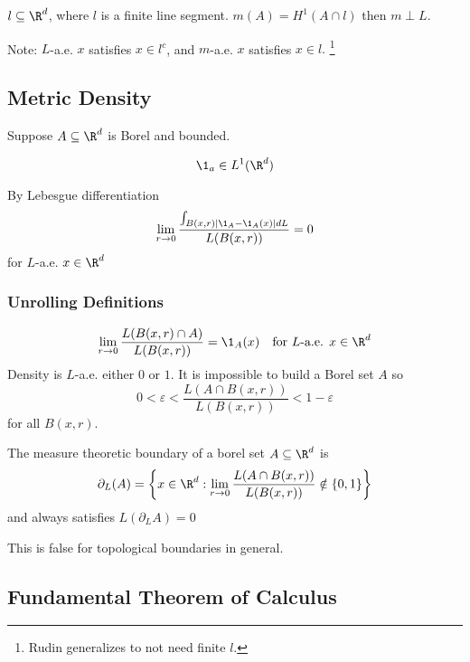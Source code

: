 \begin{example}
	$l \subseteq \R^d$, where $l$ is a finite line segment. $m(A) = H^1 (A \cap l)$
	then $m \perp L$.
\end{example}
Note: $L$-a.e. $x$ satisfies $x \in l^c$, and $m$-a.e. $x$ satisfies $x \in l.$
\footnote{Rudin generalizes to not need finite $l$.}

\subsection{Metric Density}

Suppose $A \subseteq \R^d$ is Borel and bounded.

\begin{remark}
	 \[
		\1_a \in L^1 (\R^d)
	\]
\end{remark}

\noindent By Lebesgue differentiation
\begin{align*}
	\lim_{r \to 0} \frac{\int_{B(x,r) |\1_A - \1_A(x)| dL}}{L(B(x,r))} = 0
\end{align*} for $L$-a.e. $x \in \R^d$

\subsubsection{Unrolling Definitions}

\[
	\lim_{r \to 0}  \frac{L(B(x,r) \cap A)}{L(B(x,r))} = \1_{A} (x)
	\quad \text{for } L \text{-a.e. } x \in \R^d
\]
Density is $L$-a.e. either $0$ or $1$. It is impossible to build a Borel set $A$ so
\[
	0 < \varepsilon < \frac{L(A \cap B(x,r))}{L(B(x,r))} < 1 - \varepsilon
\]
for all $B(x,r)$.

\begin{remark}
	The measure theoretic boundary of a borel set $A \subseteq \R^d$ is
	\[
\partial_{L}(A) = \left\{x \in \R^d : \lim_{r \to 0}  \frac{L(A \cap B(x,r))}{L(B(x,r))} \notin \{0,1\} \right\}
	\]
	and always satisfies $L(\partial_{L} A) = 0$
\end{remark}


\begin{remark}
	This is false for topological boundaries in general.
\end{remark}



\subsection{Fundamental Theorem of Calculus}

